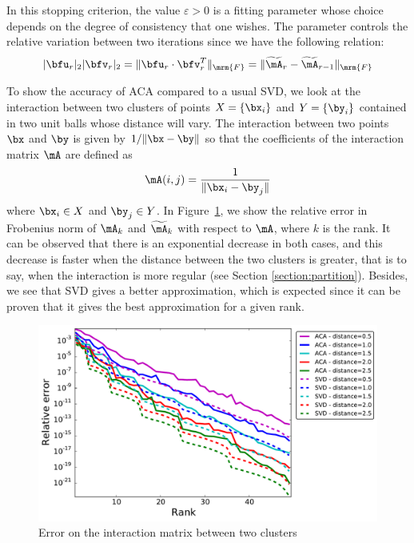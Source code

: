 In this stopping criterion, the value $\varepsilon>0$ is a fitting parameter whose choice depends on the degree of consistency 
that one wishes. The parameter controls the relative variation between two iterations since we have the following relation:
\begin{align*}
	\vert \bfu_{r}\vert_{2}\vert \bfv_{r}\vert_{2} = \Vert \bfu_r \cdot \bfv_r^T \Vert_{\mrm{F}} =  \Vert \widetilde{\mA}_{r} - \widetilde{\mA}_{r-1}\Vert_{\mrm{F}}
\end{align*}

\bigskip

\begin{remark1}
\label{remark:err_decrease}
To show the accuracy of ACA compared to a usual SVD, we look at the interaction between two clusters of points $X=\{ \bx_i\}$ and $Y=\{ \by_i\}$ contained in two unit balls whose distance will vary. The interaction between two points $\bx$ and $\by$ is given by $1/ \Vert \bx -\by \Vert$ so that the coefficients of the interaction matrix $\mA$ are defined as 
\begin{align*}
\mA (i,j) = \dfrac{1}{\Vert \bx_i - \by_j \Vert}
\end{align*}
where $\bx_i \in X$ and $\by_j \in Y$. In Figure~\ref{fig:err_decrease}, we show the relative error in Frobenius norm of $\mA_k$ and $\widetilde{\mA}_k$ with respect to $\mA$, where $k$ is the rank. It can be observed that there is an exponential decrease in both cases, and this decrease is faster when the distance between the two clusters is greater, that is to say, when the interaction is more regular (see Section \ref{section:partition}). Besides, we see that SVD gives a better approximation, which is expected since it can be proven that it gives the best approximation for a given rank.
\end{remark1}

\begin{figure}
\centering
\includegraphics[width=.9\textwidth]{../images/graphe_output_err_decrease}
\caption{Error on the interaction matrix between two clusters}
\label{fig:err_decrease}
\end{figure}




